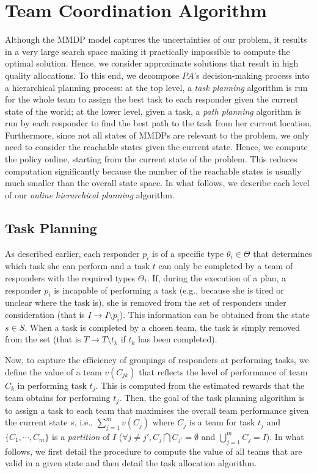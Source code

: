 \section{Team Coordination Algorithm}
\label{sec:algo}
Although the MMDP model captures the uncertainties of our
problem, it results in a very large search space making it
practically impossible to compute the optimal solution. Hence, we consider approximate solutions that result in
high quality allocations. To this end, we decompose $PA$'s
decision-making process into a hierarchical planning process: at the top level, a {\em task planning} algorithm is run
for the whole team to assign the best task to each responder given
the current state of the world; at the lower level, given a task, a
{\em path planning} algorithm is run by each responder to find the
best path to the task from her current location. Furthermore,
since not all states of MMDPs are relevant to the problem, we
only need to consider the reachable states given the current state.
Hence, we compute the policy online, starting from the current state
of the problem. This reduces computation significantly
because the number of the reachable states is usually much smaller
than the overall state space. In what follows, we describe each
level of our {\em online hierarchical planning} algorithm.

\subsection{Task Planning} \label{sec:taskplanning} As described earlier, each responder $p_i$ is of a specific type
$\theta_i \in \Theta$ that determines which task she can perform
and  a task $t$ can only be completed by a team of responders with
the required types $\Theta_t$. If, during the execution
of a plan, a responder $p_i$ is incapable of performing a task
(e.g., because she is tired or unclear where the task is), she
is removed from the set of responders under consideration
(that is $I \to I \setminus p_i$). This information can be obtained
from the state $s \in S$. When a task is completed by a chosen
team, the task is simply removed from the set (that is $T \to
T\setminus t_k$ if $t_k$ has been completed).

Now, to capture the efficiency of groupings of responders at
performing tasks, we define the value of a team $v(C_{jk})$ that
reflects the level of performance of team $C_k$ in performing task
$t_j$. This is computed from the estimated rewards that the team
obtains for performing $t_j$.  Then, the goal of the task planning
algorithm is to assign a task to each team that maximises the
overall team performance given the current state $s$, i.e.,
$\sum_{j=1}^m v(C_{j})$ where $C_j$ is a team for task $t_j$ and
$\{ C_1, \cdots, C_m \}$ is a {\em partition} of $I$ ($\forall
j\neq j', C_j \bigcap C_{j'} = \emptyset$ and $\bigcup_{j=1}^m
C_j=I$). In what follows, we first detail the procedure to compute
the value of all teams that are valid in a given state and then
detail the task allocation algorithm.


